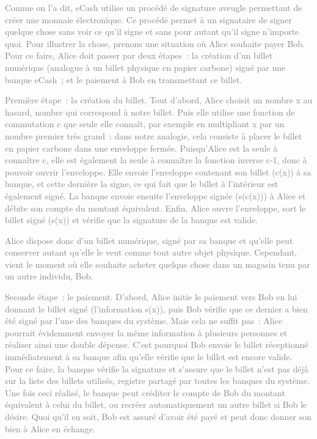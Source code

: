 \textcolor{gray}{Comme on l'a dit, eCash utilise un procédé de signature aveugle permettant de créer une monnaie électronique. Ce procédé permet à un signataire de signer quelque chose sans voir ce qu'il signe et sans pour autant qu'il signe n'importe quoi. Pour illustrer la chose, prenons une situation où Alice souhaite payer Bob. Pour ce faire, Alice doit passer par deux étapes~: la création d'un billet numérique (analogue à un billet physique en papier carbone) signé par une banque eCash~; et le paiement à Bob en transmettant ce billet.}

\textcolor{gray}{Première étape~: la création du billet. Tout d'abord, Alice choisit un nombre x au hasard, nombre qui correspond à notre billet. Puis elle utilise une fonction de commutation c que seule elle connaît, par exemple en multipliant x par un nombre premier très grand~: dans notre analogie, cela consiste à placer le billet en papier carbone dans une enveloppe fermée. Puisqu'Alice est la seule à connaître c, elle est également la seule à connaître la fonction inverse c-1, donc à pouvoir ouvrir l'enveloppe. Elle envoie l'enveloppe contenant son billet (c(x)) à sa banque, et cette dernière la signe, ce qui fait que le billet à l'intérieur est également signé. La banque envoie ensuite l'enveloppe signée (s(c(x))) à Alice et débite son compte du montant équivalent. Enfin, Alice ouvre l'enveloppe, sort le billet signé (s(x)) et vérifie que la signature de la banque est valide.}

\textcolor{gray}{Alice dispose donc d'un billet numérique, signé par sa banque et qu'elle peut conserver autant qu'elle le veut comme tout autre objet physique. Cependant, vient le moment où elle souhaite acheter quelque chose dans un magasin tenu par un autre individu, Bob.}

\textcolor{gray}{Seconde étape~: le paiement. D'abord, Alice initie le paiement vers Bob en lui donnant le billet signé (l'information s(x)), puis Bob vérifie que ce dernier a bien été signé par l'une des banques du système. Mais cela ne suffit pas~: Alice pourrait évidemment envoyer la même information à plusieurs personnes et réaliser ainsi une double dépense. C'est pourquoi Bob envoie le billet réceptionné immédiatement à sa banque afin qu'elle vérifie que le billet est encore valide. Pour ce faire, la banque vérifie la signature et s'assure que le billet n'est pas déjà sur la liste des billets utilisés, registre partagé par toutes les banques du système. Une fois ceci réalisé, le banque peut créditer le compte de Bob du montant équivalent à celui du billet, ou recréer automatiquement un autre billet si Bob le désire. Quoi qu'il en soit, Bob est assuré d'avoir été payé et peut donc donner son bien à Alice en échange.}




